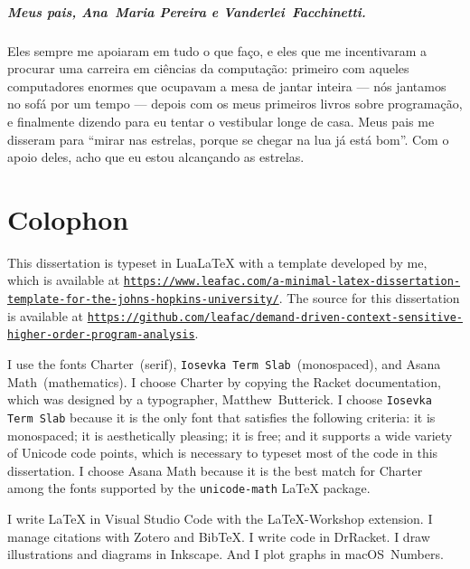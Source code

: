 \documentclass[12pt, oneside]{book}
\begin{document}
\paragraph{Meus pais, Ana~Maria Pereira e Vanderlei~Facchinetti.}

Eles sempre me apoiaram em tudo o que faço, e eles que me incentivaram a procurar uma carreira em ciências da computação: primeiro com aqueles computadores enormes que ocupavam a mesa de jantar inteira — nós jantamos no sofá por um tempo — depois com os meus primeiros livros sobre programação, e finalmente dizendo para eu tentar o vestibular longe de casa. Meus pais me disseram para “mirar nas estrelas, porque se chegar na lua já está bom”. Com o apoio deles, acho que eu estou alcançando as estrelas.

\chapter{Colophon}

This dissertation is typeset in Lua\LaTeX{} with a template developed by me, which is available at \href{https://www.leafac.com/a-minimal-latex-dissertation-template-for-the-johns-hopkins-university/}{\texttt{https://www.leafac.com/a-minimal-latex-dissertation-template-for-the-johns-hopkins-university/}}. The source for this dissertation is available at \href{https://github.com/leafac/demand-driven-context-sensitive-higher-order-program-analysis}{\texttt{https://github.com/leafac/demand-driven-context-sensitive-higher-order-program-analysis}}.

I use the fonts Charter~(serif), \texttt{Iosevka Term Slab}~(monospaced), and Asana Math~(mathematics). I choose Charter by copying the Racket documentation, which was designed by a typographer, Matthew~Butterick. I choose \texttt{Iosevka Term Slab} because it is the only font that satisfies the following criteria: it is monospaced; it is aesthetically pleasing; it is free; and it supports a wide variety of Unicode code points, which is necessary to typeset most of the code in this dissertation. I choose Asana Math because it is the best match for Charter among the fonts supported by the \texttt{unicode-math} \LaTeX{} package.

I write \LaTeX{} in Visual Studio Code with the LaTeX-Workshop extension. I manage citations with Zotero and Bib\TeX{}. I write code in DrRacket. I draw illustrations and diagrams in Inkscape. And I plot graphs in macOS~Numbers.

\tableofcontents
\listoftables
\listoffigures
\end{document}
